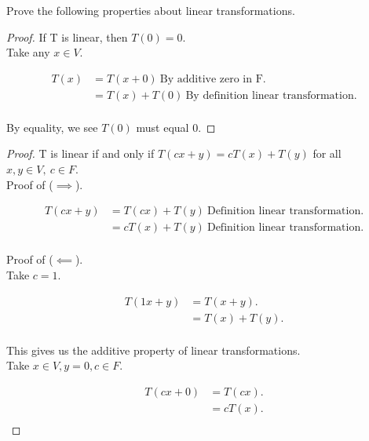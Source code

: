 \documentclass[12pt]{article}
\newenvironment{exercise}[2][Exercise]{\begin{trivlist}
\item[\hskip \labelsep{\bfseries #1}\hskip \labelsep{\bfseries #2.}]}{\end{trivlist}}
\begin{document}
\begin{exercise}{2.1.7} Prove the following properties about linear transformations.

    \begin{proof} If T is linear, then $T(0) = 0$. \\

        \noindent Take any $x \in V$.

        \begin{align*}
            T(x) 
            & = T(x + 0)\ \text{By additive zero in F.} \\
            & = T(x) + T(0)\ \text{By definition linear transformation.} \\
        \end{align*}
        
        \noindent By equality, we see $T(0)$ must equal 0.

    \end{proof}

    \begin{proof} T is linear if and only if $T(cx + y) = cT(x) + T(y)$ for all $x, y \in V,\ c \in F$. \\

        \noindent Proof of ($\implies$).

        \begin{align*}
            T(cx + y) 
            & = T(cx) + T(y)\ \text{Definition linear transformation.} \\
            & = cT(x) + T(y)\ \text{Definition linear transformation.} \\
        \end{align*}

        \noindent Proof of ($\impliedby$). \\

        \noindent Take $c = 1$.

        \begin{align*}
            T(1x + y) 
            & = T(x + y). \\
            & = T(x) + T(y). \\
        \end{align*}
        
        \noindent This gives us the additive property of linear transformations. \\

        \noindent Take $x \in V, y = 0, c \in F$.

        \begin{align*}
            T(cx + 0) 
            & = T(cx). \\
            & = cT(x). \\
        \end{align*}


\end{proof}
\end{exercise}
\end{document}
